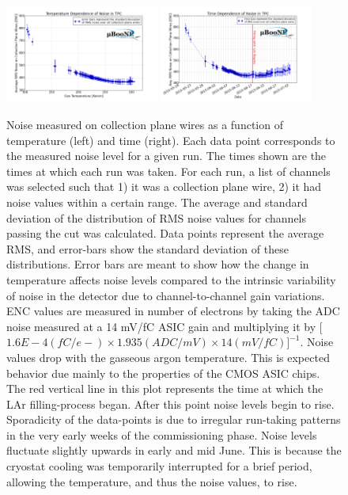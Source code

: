 \begin{figure}[htb]
  \centering
  \includegraphics[width=0.45\textwidth]{lartpc_figures/noise_vs_temp.png}
  \includegraphics[width=0.45\textwidth]{lartpc_figures/noise_vs_time.png}
  \caption[\uboone Noise Temperature Dependence]{Noise measured on collection plane wires as a function of temperature (left) and time (right). Each data point corresponds to the measured noise level for a given run. The times shown are the times at which each run was taken. For each run, a list of channels was selected such that 1) it was a collection plane wire, 2) it had noise values within a certain range. The average and standard deviation of the distribution of RMS noise values for channels passing the cut was calculated. Data points represent the average RMS, and error-bars show the standard deviation of these distributions. Error bars are meant to show how the change in temperature affects noise levels compared to the intrinsic variability of noise in the detector due to channel-to-channel gain variations. ENC values are measured in number of electrons by taking the ADC noise measured at a 14 mV/fC ASIC gain and multiplying it by [ $1.6E-4 (fC/e-) \times 1.935 (ADC/mV) \times 14 (mV/fC)]^{-1}$. Noise values drop with the gasseous argon temperature. This is expected behavior due mainly to the properties of the CMOS ASIC chips. The red vertical line in this plot represents the time at which the LAr filling-process began. After this point noise levels begin to rise.  Sporadicity of the data-points is due to irregular run-taking patterns in the very early weeks of the commissioning phase. Noise levels fluctuate slightly upwards in early and mid June. This is because the cryostat cooling was temporarily interrupted for a brief period, allowing the temperature, and thus the noise values, to rise. \cite{uboone_pub_1001} }
  \label{fig:noise_vs_temp}
\end{figure}

